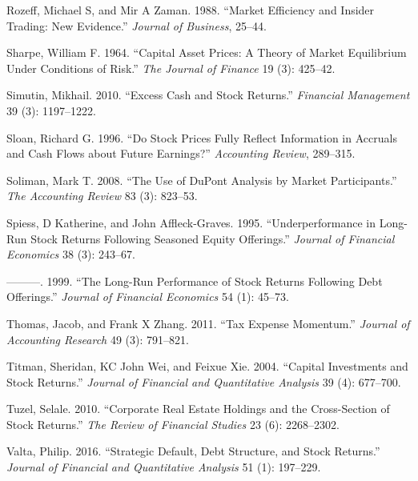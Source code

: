 \documentclass[
  letterpaper,
  DIV=11,
  numbers=noendperiod]{scrreprt}
\newlength{\cslhangindent}
\newlength{\cslentryspacingunit} %
\newenvironment{CSLReferences}[2] %
 {%
  \setlength{\parindent}{0pt}
  \ifodd #1
  \let\oldpar\par
  \def\par{\hangindent=\cslhangindent\oldpar}
  \fi
  \setlength{\parskip}{#2\cslentryspacingunit}
 }%
 {}
\begin{document}
\begin{CSLReferences}{1}{0}
\leavevmode{}%
Rozeff, Michael S, and Mir A Zaman. 1988. {``Market Efficiency and
Insider Trading: New Evidence.''} \emph{Journal of Business}, 25--44.

\leavevmode{}%
Sharpe, William F. 1964. {``Capital Asset Prices: A Theory of Market
Equilibrium Under Conditions of Risk.''} \emph{The Journal of Finance}
19 (3): 425--42.

\leavevmode{}%
Simutin, Mikhail. 2010. {``Excess Cash and Stock Returns.''}
\emph{Financial Management} 39 (3): 1197--1222.

\leavevmode{}%
Sloan, Richard G. 1996. {``Do Stock Prices Fully Reflect Information in
Accruals and Cash Flows about Future Earnings?''} \emph{Accounting
Review}, 289--315.

\leavevmode{}%
Soliman, Mark T. 2008. {``The Use of DuPont Analysis by Market
Participants.''} \emph{The Accounting Review} 83 (3): 823--53.

\leavevmode{}%
Spiess, D Katherine, and John Affleck-Graves. 1995. {``Underperformance
in Long-Run Stock Returns Following Seasoned Equity Offerings.''}
\emph{Journal of Financial Economics} 38 (3): 243--67.

\leavevmode{}%
---------. 1999. {``The Long-Run Performance of Stock Returns Following
Debt Offerings.''} \emph{Journal of Financial Economics} 54 (1): 45--73.

\leavevmode{}%
Thomas, Jacob, and Frank X Zhang. 2011. {``Tax Expense Momentum.''}
\emph{Journal of Accounting Research} 49 (3): 791--821.

\leavevmode{}%
Titman, Sheridan, KC John Wei, and Feixue Xie. 2004. {``Capital
Investments and Stock Returns.''} \emph{Journal of Financial and
Quantitative Analysis} 39 (4): 677--700.

\leavevmode{}%
Tuzel, Selale. 2010. {``Corporate Real Estate Holdings and the
Cross-Section of Stock Returns.''} \emph{The Review of Financial
Studies} 23 (6): 2268--2302.

\leavevmode{}%
Valta, Philip. 2016. {``Strategic Default, Debt Structure, and Stock
Returns.''} \emph{Journal of Financial and Quantitative Analysis} 51
(1): 197--229.


\end{CSLReferences}
\end{document}
